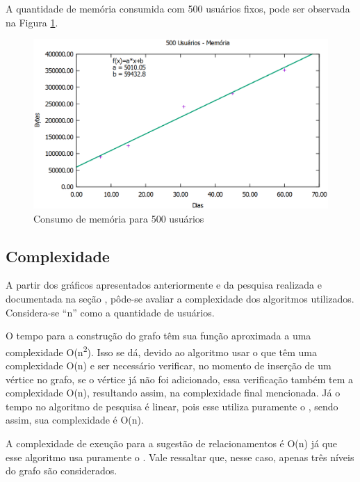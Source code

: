 A quantidade de memória consumida com 500 usuários fixos, pode ser observada na Figura \ref{500users_memoria}.

\newpage

\begin{figure}[!h]
	\centering
	\includegraphics[scale=0.55]{figuras/resultados/graficos/500_users_memoria.eps}
	\caption[Consumo de memória para 500 usuários]{Consumo de memória para 500 usuários}
	\label{500users_memoria}
\end{figure}

\subsection{Complexidade}

A partir dos gráficos apresentados anteriormente e da pesquisa realizada e documentada na seção , pôde-se avaliar a complexidade dos algoritmos utilizados. Considera-se ``n'' como a quantidade de usuários.

O tempo para a construção do grafo têm sua função aproximada a uma complexidade O(n\textsuperscript{2}). Isso se dá, devido ao algoritmo usar o  que têm uma complexidade O(n) e ser necessário verificar, no momento de inserção de um vértice no grafo, se o vértice já não foi adicionado, essa verificação também tem a complexidade O(n), resultando assim, na complexidade final mencionada. Já o tempo no algoritmo de pesquisa é linear, pois esse utiliza puramente o , sendo assim, sua complexidade é O(n).

A complexidade de exeução para a sugestão de relacionamentos é O(n) já que esse algoritmo usa puramente o . Vale ressaltar que, nesse caso, apenas três níveis do grafo são considerados.

